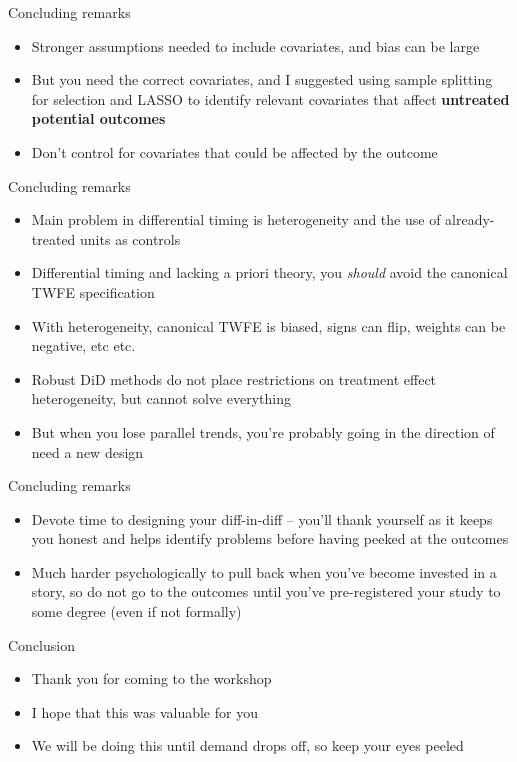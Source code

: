 \documentclass{beamer}
\begin{document}
\begin{frame}{Concluding remarks}

\begin{itemize}
\item Stronger assumptions needed to include covariates, and bias can be large
\item But you need the correct covariates, and I suggested using sample splitting for selection and LASSO to identify relevant covariates that affect \textbf{untreated potential outcomes}
\item Don't control for covariates that could be affected by the outcome 
\end{itemize}

\end{frame}

\begin{frame}{Concluding remarks}

\begin{itemize}
\item Main problem in differential timing is heterogeneity and the use of already-treated units as controls
\item Differential timing and lacking a priori theory, you \emph{should} avoid the canonical TWFE specification  
\item With heterogeneity, canonical TWFE is biased, signs can flip, weights can be negative, etc etc.
\item Robust DiD methods do not place restrictions on treatment effect heterogeneity, but cannot solve everything
\item But when you lose parallel trends, you're probably going in the direction of need a new design
\end{itemize}

\end{frame}

\begin{frame}{Concluding remarks}

\begin{itemize}
\item Devote time to designing your diff-in-diff -- you'll thank yourself as it keeps you honest and helps identify problems before having peeked at the outcomes
\item Much harder psychologically to pull back when you've become invested in a story, so do not go to the outcomes until you've pre-registered your study to some degree (even if not formally)
\end{itemize}

\end{frame}

\begin{frame}{Conclusion}

\begin{itemize}
\item Thank you for coming to the workshop
\item I hope that this was valuable for you
\item We will be doing this until demand drops off, so keep your eyes peeled
\end{itemize}

\end{frame}
\end{document}
